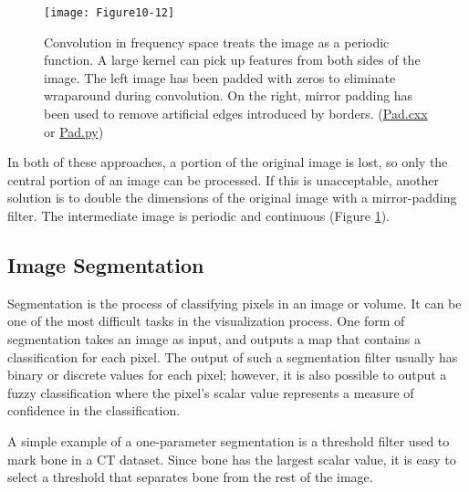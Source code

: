 \begin{figure}[!htb]
	\centering
	\texttt{[image: Figure10-12]}
	\caption{Convolution in frequency space treats the image as a periodic function. A large kernel can pick up features from both sides of the image. The left image has been padded with zeros to eliminate wraparound during convolution. On the right, mirror padding has been used to remove artificial edges introduced by borders. (\href{https://lorensen.github.io/VTKExamples/site/Cxx/ImageProcessing/Pad/}{Pad.cxx} or \href{https://lorensen.github.io/VTKExamples/site/Python/ImageProcessing/Pad/}{Pad.py})}
	\label{fig:Figure10-12}
\end{figure}


In both of these approaches, a portion of the original image is lost, so only the central portion of an image can be processed. If this is unacceptable, another solution is to double the dimensions of the original image with a mirror-padding filter. The intermediate image is periodic and continuous (Figure \ref{fig:Figure10-12}).

\subsection {Image Segmentation}

Segmentation is the process of classifying pixels in an image or volume. It can be one of the most difficult tasks in the visualization process. One form of segmentation takes an image as input, and outputs a map that contains a classification for each pixel. The output of such a segmentation filter usually has binary or discrete values for each pixel; however, it is also possible to output a fuzzy classification where the pixel's scalar value represents a measure of confidence in the classification.

A simple example of a one-parameter segmentation is a threshold filter used to mark bone in a CT dataset. Since bone has the largest scalar value, it is easy to select a threshold that separates bone from the rest of the image.

